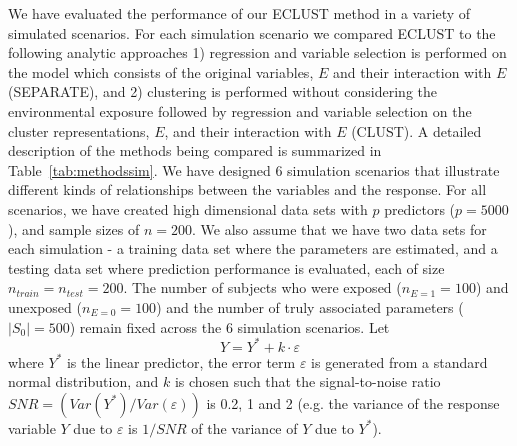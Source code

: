 We have evaluated the performance of our ECLUST method in a variety of simulated scenarios. For each simulation scenario we compared ECLUST to the following analytic approaches 1) regression and variable selection is performed on the model which consists of the original variables, $E$ and their interaction with $E$ (SEPARATE), and 2) clustering is performed without considering the environmental exposure followed by regression and variable selection on the cluster representations, $E$, and their interaction with $E$ (CLUST). A detailed description of the methods being compared is summarized in Table~\ref{tab:methodssim}. We have designed 6 simulation scenarios that illustrate different kinds of relationships between the variables and the response. For all scenarios, we have created high dimensional data sets with $p$ predictors ($p=5000$), and sample sizes of $n=200$.  We also assume that we have two data sets for each simulation - a training data set where the parameters are estimated, and a testing data set where prediction performance is evaluated, each of size $n_{train} = n_{test} = 200$. The number of subjects who were exposed ($n_{E=1}=100$) and unexposed ($n_{E=0}=100$) and the number of truly associated parameters ($\lvert  S_0 \rvert = 500 $) remain fixed across the 6 simulation scenarios. Let
\begin{equation}
Y = Y^* + k \cdot \varepsilon \label{eq:response}
\end{equation} 
where $Y^*$ is the linear predictor, the error term $\varepsilon$ is generated from a standard normal distribution, and $k$ is chosen such that the signal-to-noise ratio $SNR = \left(Var(Y^*)/Var(\varepsilon)\right)$ is 0.2, 1 and 2  (e.g. the variance of the response variable $Y$ due to $\varepsilon$ is $1/SNR$ of the variance of $Y$ due to $Y^*$).




